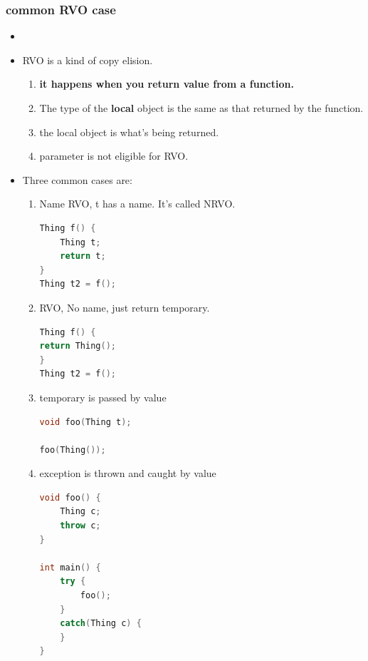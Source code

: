 \documentclass[a4paper,12pt,twoside]{book}
\begin{document}
\subsubsection{common RVO case}
\begin{itemize}
	\item \item RVO is a kind of copy elision. 
	\begin{enumerate}
		\item \textbf{it happens when you return value from a function.}
		\item The type of the \textbf{local} object is the same as that returned by the function.
		\item the local object is what's being returned.
		\item parameter is not eligible for RVO. 
	\end{enumerate}
	
	\item Three common cases are:
	\begin{enumerate}
		\item Name RVO, t has a name. It's called NRVO.
\begin{lstlisting}[frame=single, language=c++, mathescape=true]
Thing f() {
	Thing t;
	return t;
}
Thing t2 = f();
\end{lstlisting}

		\item RVO, No name, just return temporary.
\begin{lstlisting}[frame=single, language=c++, mathescape=true]
Thing f() {
return Thing();
}
Thing t2 = f();
\end{lstlisting}

		\item temporary is passed by value
\begin{lstlisting}[frame=single, language=c++, mathescape=true]
void foo(Thing t);

foo(Thing());
\end{lstlisting}

\item exception is thrown and caught by value
\begin{lstlisting}[frame=single, language=c++, mathescape=true]
void foo() {
	Thing c;
	throw c;
}

int main() {
	try {
		foo();
	}
	catch(Thing c) {  
	}             
}
\end{lstlisting}

	\end{enumerate}

\end{itemize}
\end{document}
